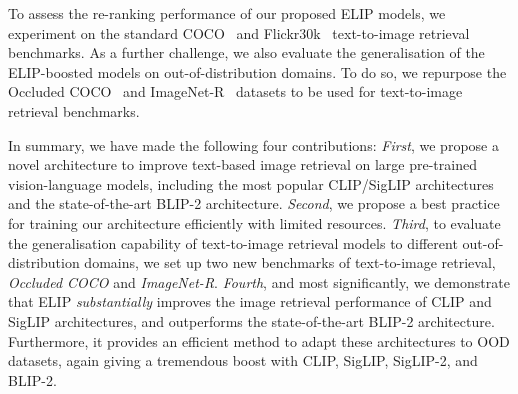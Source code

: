 To assess the re-ranking performance of our proposed ELIP models, 
we experiment on the standard COCO~\cite{lin2014microsoft} and Flickr30k~\cite{plummer2015flickr30k} text-to-image retrieval benchmarks. 
As a further challenge, we also evaluate the generalisation of the ELIP-boosted models on out-of-distribution domains. To do so, we repurpose the Occluded COCO~\cite{lee2022instance} and ImageNet-R~\cite{hendrycks2021many} datasets to be used for text-to-image retrieval benchmarks. 


In summary, we have made the following four contributions:
\emph{First}, we propose a novel architecture to improve text-based image retrieval on large pre-trained vision-language models, including the most popular CLIP/SigLIP architectures 
and the state-of-the-art BLIP-2 architecture.
\emph{Second}, we propose a best practice for training our architecture efficiently with limited resources.
\emph{Third}, to evaluate the generalisation capability of text-to-image retrieval models to different out-of-distribution domains, we set up two new benchmarks of text-to-image retrieval, \emph{Occluded COCO} and \emph{ImageNet-R}. 
\emph{Fourth}, and most significantly, we demonstrate that ELIP  {\em substantially} improves the image retrieval performance of CLIP and SigLIP architectures, and outperforms the state-of-the-art BLIP-2 architecture. Furthermore, it provides an efficient method
to adapt these architectures to OOD datasets, again giving a tremendous boost with CLIP, SigLIP, SigLIP-2, and BLIP-2.  
